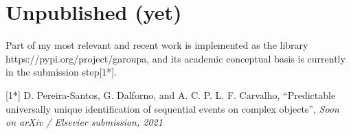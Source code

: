    \section{Unpublished (yet)}
   Part of my most relevant and recent work is implemented as the library https://pypi.org/project/garoupa, and its academic conceptual basis is currently in the submission step[1*].
\vspace{0.5cm}

[1*] D. Pereira-Santos, G. Dalforno, and A. C. P. L. F. Carvalho, “Predictable universally unique identification of sequential events on complex objects”, \textit{Soon on arXiv / Elsevier submission, 2021}

\nocite{*}
\printbibliography[title=Publications]

